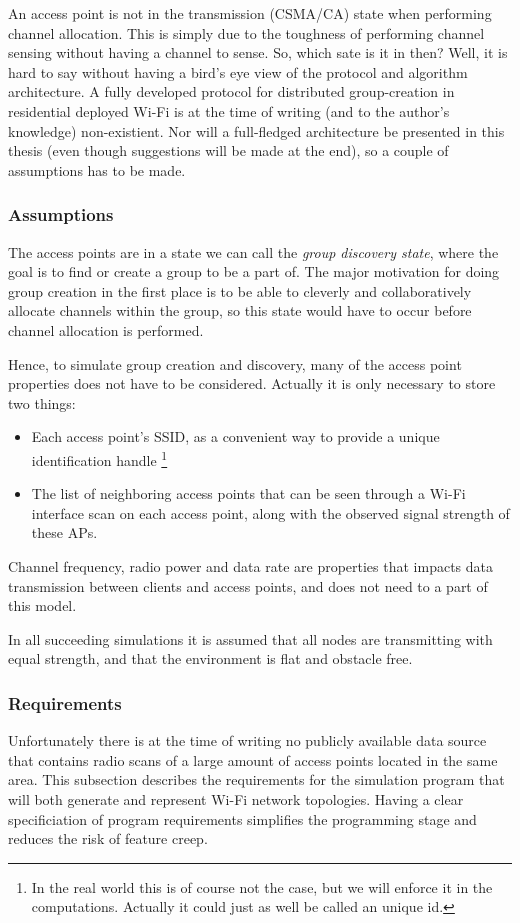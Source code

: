 An access point is not in the transmission (CSMA/CA) state when performing channel allocation. This is simply due to the toughness of performing channel sensing without
having a channel to sense. So, which sate is it in then? Well, it is hard to say without having a bird's eye view of the protocol and algorithm architecture. A fully developed protocol
for distributed group-creation in residential deployed Wi-Fi is at the time of writing (and to the author's knowledge) non-existient.  Nor will a full-fledged architecture be presented in
this thesis (even though suggestions will be made at the end), so a couple of assumptions has to be made. 

\subsubsection{Assumptions}
The access points are in a state we can call the \textit{group discovery state}, where the goal is to find or create a group to be a part of.
The major motivation for doing group creation in the first place is to be able to cleverly and collaboratively allocate channels within the group, so this state would
have to occur before channel allocation is performed. 

Hence, to simulate group creation and discovery, many of the access point properties does not have to be considered. Actually it is only necessary to store two things:
\begin{itemize}
	\item Each access point's SSID, as a convenient way to provide a unique identification handle \footnote{In the real world this is of course not the case,
but we will enforce it in the computations. Actually it could just as well be called an unique id.}
	\item The list of neighboring access points that can be seen through a Wi-Fi interface scan on each access point, along with the observed signal strength of these APs.
\end{itemize}
Channel frequency, radio power and data rate are properties that impacts data transmission between clients and access points, and does not need to a 
part of this model. 

In all succeeding simulations it is assumed that all nodes are transmitting with equal strength, and that the environment is flat and obstacle free. 

\subsubsection{Requirements}
Unfortunately there is at the time of writing no publicly available data source that contains radio scans of a large amount of access points located in the same area.
This subsection describes the requirements for the simulation program that will both generate and represent Wi-Fi network topologies. Having a clear specificiation of program requirements
simplifies the programming stage and reduces the risk of feature creep. 

